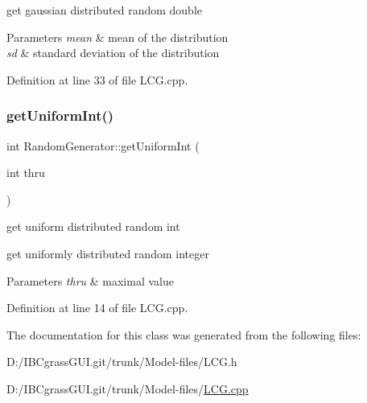 get gaussian distributed random double 
\begin{DoxyParams}{Parameters}
{\em mean} & mean of the distribution \\
\hline
{\em sd} & standard deviation of the distribution \\
\hline
\end{DoxyParams}


Definition at line 33 of file L\+C\+G.\+cpp.

\mbox{\label{class_random_generator_a31e96453c7e88653190a31537f0402eb}} 
\subsubsection{\texorpdfstring{getUniformInt()}{getUniformInt()}}
{\footnotesize\ttfamily int Random\+Generator\+::get\+Uniform\+Int (\begin{DoxyParamCaption}\item[{int}]{thru }\end{DoxyParamCaption})}



get uniform distributed random int 

get uniformly distributed random integer 
\begin{DoxyParams}{Parameters}
{\em thru} & maximal value \\
\hline
\end{DoxyParams}


Definition at line 14 of file L\+C\+G.\+cpp.



The documentation for this class was generated from the following files\+:\begin{DoxyCompactItemize}
\item 
D\+:/\+I\+B\+Cgrass\+G\+U\+I.\+git/trunk/\+Model-\/files/L\+C\+G.\+h\item 
D\+:/\+I\+B\+Cgrass\+G\+U\+I.\+git/trunk/\+Model-\/files/\mbox{\hyperlink{_l_c_g_8cpp}{L\+C\+G.\+cpp}}\end{DoxyCompactItemize}
